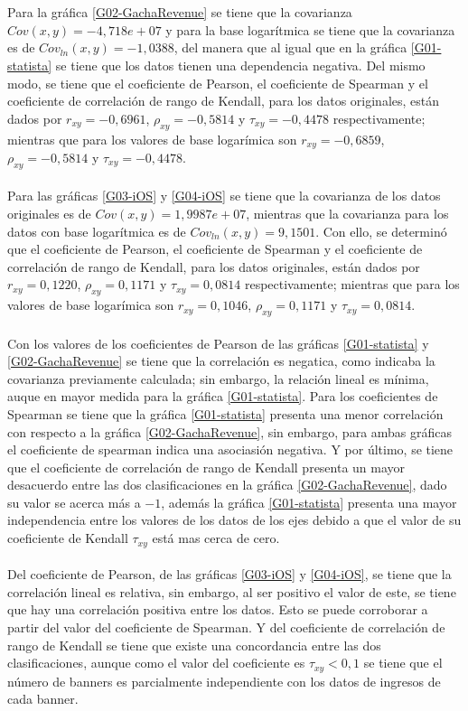\documentclass[osajnl,twocolumn,showpacs,superscriptaddress,10pt]{revtex4-2}
\begin{document}
\\\\
Para la gráfica \ref{G02-GachaRevenue} se tiene que la covarianza $Cov(x,y)=-4,718e+07$ y para la base logarítmica se tiene que la covarianza es de $Cov_{ln}(x,y)=-1,0388$, del manera que al igual que en la gráfica \ref{G01-statista} se tiene que los datos tienen una dependencia negativa. Del mismo modo, se tiene que el coeficiente de Pearson, el coeficiente de Spearman y el coeficiente de correlación de rango de Kendall, para los datos originales, están dados por $r_{xy}=-0,6961$, $\rho_{xy}=-0,5814$ y $\tau_{xy}=-0,4478$ respectivamente; mientras que para los valores de base logarímica son $r_{xy}=-0,6859$, $\rho_{xy}=-0,5814$ y $\tau_{xy}=-0,4478$.
\\\\
Para las gráficas \ref{G03-iOS} y \ref{G04-iOS} se tiene que la covarianza de los datos originales es de $Cov(x,y)=1,9987e+07$, mientras que la covarianza para los datos con base logarítmica  es de $Cov_{ln}(x,y)=9,1501$. Con ello, se determinó que el coeficiente de Pearson, el coeficiente de Spearman y el coeficiente de correlación de rango de Kendall, para los datos originales, están dados por $r_{xy}=0,1220$, $\rho_{xy}=0,1171$ y $\tau_{xy}=0,0814$ respectivamente; mientras que para los valores de base logarímica son $r_{xy}=0,1046$, $\rho_{xy}=0,1171$ y $\tau_{xy}=0,0814$.
\\\\
Con los valores de los coeficientes de Pearson de las gráficas \ref{G01-statista} y \ref{G02-GachaRevenue} se tiene que la correlación es negatica, como indicaba la covarianza previamente calculada; sin embargo, la relación lineal es mínima, auque en mayor medida para la gráfica \ref{G01-statista}. Para los coeficientes de Spearman se tiene que la gráfica \ref{G01-statista} presenta una menor correlación con respecto a la gráfica \ref{G02-GachaRevenue}, sin embargo, para ambas gráficas el coeficiente de spearman indica una asociasión negativa. Y por último, se tiene que el coeficiente de correlación de rango de Kendall presenta un mayor desacuerdo entre las dos clasificaciones en la gráfica \ref{G02-GachaRevenue}, dado su valor se acerca más a $-1$, además la gráfica \ref{G01-statista} presenta una mayor independencia entre los valores de los datos de los ejes debido a que el valor de su coeficiente de Kendall $\tau_{xy}$ está mas cerca de cero.
\\\\
Del coeficiente de Pearson, de las gráficas \ref{G03-iOS} y \ref{G04-iOS}, se tiene que la correlación lineal es relativa, sin embargo, al ser positivo el valor de este, se tiene que hay una correlación positiva entre los datos. Esto se puede corroborar a partir del valor del coeficiente de Spearman. Y del coeficiente de correlación de rango de Kendall se tiene que existe una concordancia entre las dos clasificaciones, aunque como el valor del coeficiente es $\tau_{xy}<0,1$ se tiene que el número de banners es parcialmente independiente con los datos de ingresos de cada banner.
\end{document}
